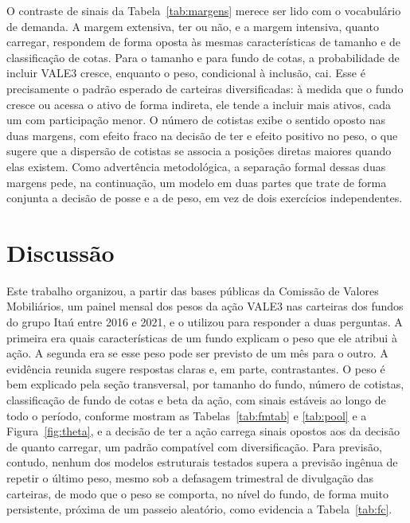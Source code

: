 \documentclass[12pt,a4paper]{article}
\begin{document}
O contraste de sinais da Tabela~\ref{tab:margens} merece ser lido com o vocabulário de demanda. A
margem extensiva, ter ou não, e a margem intensiva, quanto carregar, respondem de forma oposta às
mesmas características de tamanho e de classificação de cotas. Para o tamanho e para fundo de
cotas, a probabilidade de incluir VALE3 cresce, enquanto o peso, condicional à inclusão, cai. Esse
é precisamente o padrão esperado de carteiras diversificadas: à medida que o fundo cresce ou
acessa o ativo de forma indireta, ele tende a incluir mais ativos, cada um com participação menor.
O número de cotistas exibe o sentido oposto nas duas margens, com efeito fraco na decisão de ter e
efeito positivo no peso, o que sugere que a dispersão de cotistas se associa a posições diretas
maiores quando elas existem. Como advertência metodológica, a separação formal dessas duas margens
pede, na continuação, um modelo em duas partes que trate de forma conjunta a decisão de posse e a
de peso, em vez de dois exercícios independentes.

\section{Discussão}

Este trabalho organizou, a partir das bases públicas da Comissão de Valores Mobiliários, um painel
mensal dos pesos da ação VALE3 nas carteiras dos fundos do grupo Itaú entre 2016 e 2021, e o
utilizou para responder a duas perguntas. A primeira era quais características de um fundo explicam
o peso que ele atribui à ação. A segunda era se esse peso pode ser previsto de um mês para o
outro. A evidência reunida sugere respostas claras e, em parte, contrastantes. O peso é bem
explicado pela seção transversal, por tamanho do fundo, número de cotistas, classificação de fundo
de cotas e beta da ação, com sinais estáveis ao longo de todo o período, conforme mostram as
Tabelas~\ref{tab:fmtab} e \ref{tab:pool} e a Figura~\ref{fig:theta}, e a decisão de ter a ação
carrega sinais opostos aos da decisão de quanto carregar, um padrão compatível com diversificação.
Para previsão, contudo, nenhum dos modelos estruturais testados supera a previsão ingênua de
repetir o último peso, mesmo sob a defasagem trimestral de divulgação das carteiras, de modo que o
peso se comporta, no nível do fundo, de forma muito persistente, próxima de um passeio aleatório,
como evidencia a Tabela~\ref{tab:fc}.
\end{document}
